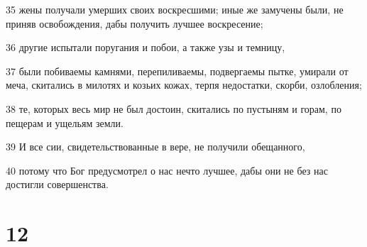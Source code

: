 \par 35 жены получали умерших своих воскресшими; иные же замучены были, не приняв освобождения, дабы получить лучшее воскресение;
\par 36 другие испытали поругания и побои, а также узы и темницу,
\par 37 были побиваемы камнями, перепиливаемы, подвергаемы пытке, умирали от меча, скитались в милотях и козьих кожах, терпя недостатки, скорби, озлобления;
\par 38 те, которых весь мир не был достоин, скитались по пустыням и горам, по пещерам и ущельям земли.
\par 39 И все сии, свидетельствованные в вере, не получили обещанного,
\par 40 потому что Бог предусмотрел о нас нечто лучшее, дабы они не без нас достигли совершенства.

\chapter{12}

